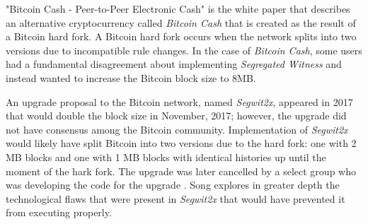 \documentclass[12pt]{report}
\begin{document}
"Bitcoin Cash - Peer-to-Peer Electronic Cash" \cite{bitcoincash.org.2017} is the white paper that describes an alternative cryptocurrency called \textit{Bitcoin Cash} that is created as the result of a Bitcoin hard fork. A Bitcoin hard fork occurs when the network splits into two versions due to incompatible rule changes. In the case of \textit{Bitcoin Cash}, some users had a fundamental disagreement about implementing \textit{Segregated Witness} and instead wanted to increase the Bitcoin block size to 8MB.

An upgrade proposal to the Bitcoin network, named \textit{Segwit2x}, appeared in 2017 that would double the block size in November, 2017; however, the upgrade did not have consensus among the Bitcoin community. Implementation of \textit{Segwit2x} would likely have split Bitcoin into two versions due to the hard fork: one with 2 MB blocks and one with 1 MB blocks with identical histories up until the moment of the hark fork. The upgrade was later cancelled by a select group who was developing the code for the upgrade \cite{Belshe.2017}. Song \cite{Song.20171120} explores in greater depth the technological flaws that were present in \textit{Segwit2x} that would have prevented it from executing properly.


\begin{comment}
\subsection{Statistics}
\cite{blockchain.info.} - Bitcoin Charts and Graphs

\cite{Coinmarketcap.com.2017} - Coinmarketcap.com

\cite{TradeBlock.com.} - Historical Data | Tradeblock

\cite{segwit.party.} - Segwit Charts

\cite{jochenhoenicke.de.} - Johoe's Mempool Size Statistics - 9/1/17 to 9/14/17

\cite{Lopp.2017} - Statoshi - Bandwidth Usage

\cite{bitcoinity.org.} - Average time to mine a block in minutes.

Miscellaneous stats:
\cite{Akamai.2017} - State of the Internet Report

\cite{AnandTech.20160512} - Market Trends: HDD Capacities Increase, Average Price Flat - Market Views: HDD Shipments Down 20\% in Q1 2016, Hit Multi-Year Low
\end{comment}
\end{document}
